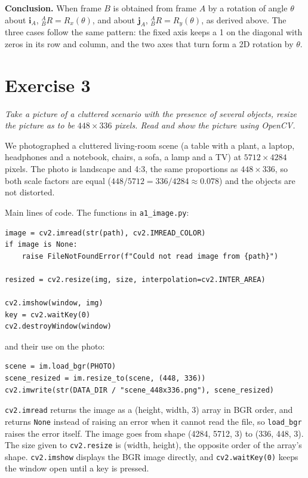 \documentclass[11pt,a4paper]{article}
\newcommand{\rot}{{}^{A}_{B}R}
\begin{document}
\textbf{Conclusion.} When frame $B$ is obtained from frame $A$ by a rotation of angle $\theta$ about $\mathbf{i}_A$, $\rot = R_x(\theta)$, and about $\mathbf{j}_A$, $\rot = R_y(\theta)$, as derived above. The three cases follow the same pattern: the fixed axis keeps a 1 on the diagonal with zeros in its row and column, and the two axes that turn form a 2D rotation by $\theta$.

\section*{Exercise 3}
\emph{Take a picture of a cluttered scenario with the presence of several objects, resize the picture as to be $448\times336$ pixels. Read and show the picture using OpenCV.}

We photographed a cluttered living-room scene (a table with a plant, a laptop, headphones and a notebook, chairs, a sofa, a lamp and a TV) at $5712\times4284$ pixels. The photo is landscape and 4:3, the same proportions as $448\times336$, so both scale factors are equal ($448/5712 = 336/4284 \approx 0.078$) and the objects are not distorted.

Main lines of code. The functions in \texttt{a1\_image.py}:
\begin{lstlisting}
image = cv2.imread(str(path), cv2.IMREAD_COLOR)
if image is None:
    raise FileNotFoundError(f"Could not read image from {path}")

resized = cv2.resize(img, size, interpolation=cv2.INTER_AREA)

cv2.imshow(window, img)
key = cv2.waitKey(0)
cv2.destroyWindow(window)
\end{lstlisting}
and their use on the photo:
\begin{lstlisting}
scene = im.load_bgr(PHOTO)
scene_resized = im.resize_to(scene, (448, 336))
cv2.imwrite(str(DATA_DIR / "scene_448x336.png"), scene_resized)
\end{lstlisting}

\texttt{cv2.imread} returns the image as a (height, width, 3) array in BGR order, and returns \texttt{None} instead of raising an error when it cannot read the file, so \texttt{load\_bgr} raises the error itself. The image goes from shape (4284, 5712, 3) to (336, 448, 3). The size given to \texttt{cv2.resize} is (width, height), the opposite order of the array's shape. \texttt{cv2.imshow} displays the BGR image directly, and \texttt{cv2.waitKey(0)} keeps the window open until a key is pressed.
\end{document}
